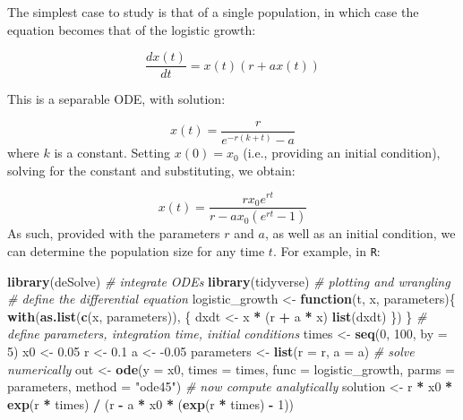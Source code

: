 \documentclass[]{book}
\newenvironment{Shaded}{\begin{snugshade}}{\end{snugshade}}
\newcommand{\CommentTok}[1]{\textcolor[rgb]{0.56,0.35,0.01}{\textit{#1}}}
\newcommand{\ControlFlowTok}[1]{\textcolor[rgb]{0.13,0.29,0.53}{\textbf{#1}}}
\newcommand{\DataTypeTok}[1]{\textcolor[rgb]{0.13,0.29,0.53}{#1}}
\newcommand{\DecValTok}[1]{\textcolor[rgb]{0.00,0.00,0.81}{#1}}
\newcommand{\FloatTok}[1]{\textcolor[rgb]{0.00,0.00,0.81}{#1}}
\newcommand{\KeywordTok}[1]{\textcolor[rgb]{0.13,0.29,0.53}{\textbf{#1}}}
\newcommand{\NormalTok}[1]{#1}
\newcommand{\OperatorTok}[1]{\textcolor[rgb]{0.81,0.36,0.00}{\textbf{#1}}}
\newcommand{\StringTok}[1]{\textcolor[rgb]{0.31,0.60,0.02}{#1}}
\begin{document}
The simplest case to study is that of a single population, in which case the equation becomes that of the logistic growth:

\[
\dfrac{dx(t)}{dt} = x(t)(r + a x(t))
\]

This is a separable ODE, with solution:

\[
x(t) = \frac{r}{e^{-r \left(k+t\right)}-a}
\]
where \(k\) is a constant. Setting \(x(0) = x_0\) (i.e., providing an initial condition), solving for the constant and substituting, we obtain:

\[
x(t) = \frac{r {x_0} e^{r t}}{r-a {x_0} \left(e^{r t}-1\right)}
\]
As such, provided with the parameters \(r\) and \(a\), as well as an initial condition, we can determine the population size for any time \(t\). For example, in \texttt{R}:

\begin{Shaded}
\begin{Highlighting}[]
\KeywordTok{library}\NormalTok{(deSolve) }\CommentTok{# integrate ODEs}
\KeywordTok{library}\NormalTok{(tidyverse) }\CommentTok{# plotting and wrangling}
\CommentTok{# define the differential equation}
\NormalTok{logistic_growth <-}\StringTok{ }\ControlFlowTok{function}\NormalTok{(t, x, parameters)\{}
  \KeywordTok{with}\NormalTok{(}\KeywordTok{as.list}\NormalTok{(}\KeywordTok{c}\NormalTok{(x, parameters)), \{}
\NormalTok{    dxdt <-}\StringTok{ }\NormalTok{x }\OperatorTok{*}\StringTok{ }\NormalTok{(r }\OperatorTok{+}\StringTok{ }\NormalTok{a }\OperatorTok{*}\StringTok{ }\NormalTok{x)}
    \KeywordTok{list}\NormalTok{(dxdt)}
\NormalTok{  \})}
\NormalTok{\}}
\CommentTok{# define parameters, integration time, initial conditions}
\NormalTok{times <-}\StringTok{ }\KeywordTok{seq}\NormalTok{(}\DecValTok{0}\NormalTok{, }\DecValTok{100}\NormalTok{, }\DataTypeTok{by =} \DecValTok{5}\NormalTok{)}
\NormalTok{x0 <-}\StringTok{ }\FloatTok{0.05}
\NormalTok{r <-}\StringTok{ }\FloatTok{0.1}
\NormalTok{a <-}\StringTok{ }\FloatTok{-0.05}
\NormalTok{parameters <-}\StringTok{ }\KeywordTok{list}\NormalTok{(}\DataTypeTok{r =}\NormalTok{ r, }\DataTypeTok{a =}\NormalTok{ a)}
\CommentTok{# solve numerically}
\NormalTok{out <-}\StringTok{ }\KeywordTok{ode}\NormalTok{(}\DataTypeTok{y =}\NormalTok{ x0, }\DataTypeTok{times =}\NormalTok{ times, }
           \DataTypeTok{func =}\NormalTok{ logistic_growth, }\DataTypeTok{parms =}\NormalTok{ parameters, }
           \DataTypeTok{method =} \StringTok{"ode45"}\NormalTok{)}
\CommentTok{# now compute analytically}
\NormalTok{solution <-}\StringTok{ }\NormalTok{r }\OperatorTok{*}\StringTok{ }\NormalTok{x0 }\OperatorTok{*}\StringTok{ }\KeywordTok{exp}\NormalTok{(r }\OperatorTok{*}\StringTok{ }\NormalTok{times) }\OperatorTok{/}\StringTok{ }\NormalTok{(r }\OperatorTok{-}\StringTok{ }\NormalTok{a }\OperatorTok{*}\StringTok{ }\NormalTok{x0 }\OperatorTok{*}\StringTok{ }\NormalTok{(}\KeywordTok{exp}\NormalTok{(r }\OperatorTok{*}\StringTok{ }\NormalTok{times) }\OperatorTok{-}\StringTok{ }\DecValTok{1}\NormalTok{))}

\end{Highlighting}
\end{Shaded}
\end{document}
